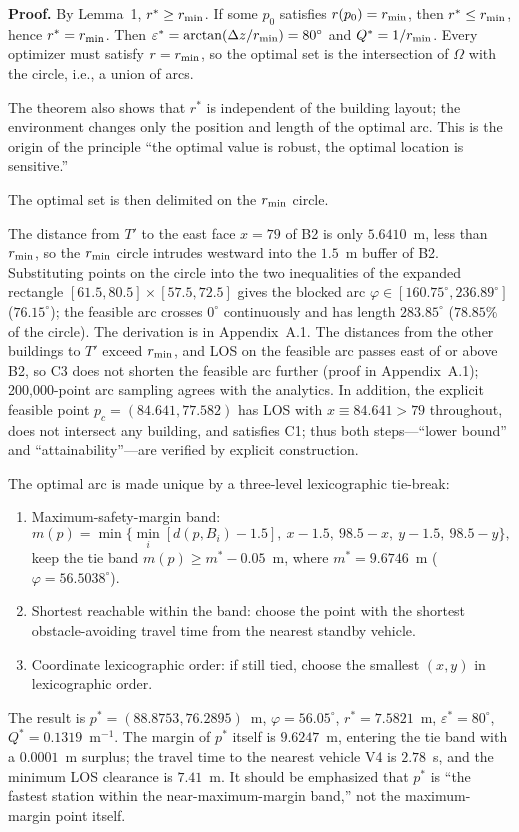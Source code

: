 \noindent\textbf{Proof.} By Lemma~1, $r^*\ge r_{\min}$. If some $p_0$ satisfies $r(p_0)=r_{\min}$, then $r^*\le r_{\min}$, hence $r^*=r_{\min}$. Then $\varepsilon^*=\arctan(\Delta z/r_{\min})=80^\circ$ and $Q^*=1/r_{\min}$. Every optimizer must satisfy $r=r_{\min}$, so the optimal set is the intersection of $\Omega$ with the circle, i.e., a union of arcs.

The theorem also shows that $r^*$ is independent of the building layout; the environment changes only the position and length of the optimal arc. This is the origin of the principle ``the optimal value is robust, the optimal location is sensitive.''

The optimal set is then delimited on the $r_{\min}$ circle.

The distance from $T'$ to the east face $x=79$ of B2 is only $5.6410$~m, less than $r_{\min}$, so the $r_{\min}$ circle intrudes westward into the $1.5$~m buffer of B2. Substituting points on the circle into the two inequalities of the expanded rectangle $[61.5,80.5]\times[57.5,72.5]$ gives the blocked arc $\varphi\in[160.75^\circ,236.89^\circ]$ ($76.15^\circ$); the feasible arc crosses $0^\circ$ continuously and has length $283.85^\circ$ ($78.85\%$ of the circle). The derivation is in Appendix~A.1. The distances from the other buildings to $T'$ exceed $r_{\min}$, and LOS on the feasible arc passes east of or above B2, so C3 does not shorten the feasible arc further (proof in Appendix~A.1); 200,000-point arc sampling agrees with the analytics. In addition, the explicit feasible point $p_c=(84.641,77.582)$ has LOS with $x\equiv84.641>79$ throughout, does not intersect any building, and satisfies C1; thus both steps---``lower bound'' and ``attainability''---are verified by explicit construction.

The optimal arc is made unique by a three-level lexicographic tie-break:
\begin{enumerate}[label=(T\arabic*)]
\item Maximum-safety-margin band:
\begin{equation}
  m(p)=\min\bigl\{\min_i[d(p,B_i)-1.5],\ x-1.5,\ 98.5-x,\ y-1.5,\ 98.5-y\bigr\},
\end{equation}
keep the tie band $m(p)\ge m^*-0.05$~m, where $m^*=9.6746$~m ($\varphi=56.5038^\circ$).
\item Shortest reachable within the band: choose the point with the shortest obstacle-avoiding travel time from the nearest standby vehicle.
\item Coordinate lexicographic order: if still tied, choose the smallest $(x,y)$ in lexicographic order.
\end{enumerate}
The result is $p^*=(88.8753,76.2895)$~m, $\varphi=56.05^\circ$, $r^*=7.5821$~m, $\varepsilon^*=80^\circ$, $Q^*=0.1319$~m$^{-1}$. The margin of $p^*$ itself is $9.6247$~m, entering the tie band with a $0.0001$~m surplus; the travel time to the nearest vehicle V4 is $2.78$~s, and the minimum LOS clearance is $7.41$~m. It should be emphasized that $p^*$ is ``the fastest station within the near-maximum-margin band,'' not the maximum-margin point itself.

